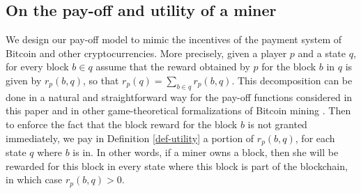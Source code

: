 
\subsection{On the pay-off and utility of a miner}
\label{sec-pay-uti}

We design our pay-off model to mimic the incentives of the payment system of Bitcoin and other cryptocurrencies. More precisely, given a player $p$ and a state $q$, for every block $b \in q$ assume that the reward obtained by $p$ for the block $b$ in $q$ is given by $r_p(b,q)$, so that $r_p(q) = \sum_{b \in q} r_p(b,q)$. This decomposition can be done in a natural and straightforward way for the pay-off functions considered in this paper and in other game-theoretical formalizations of Bitcoin mining \cite{mininggames:2016}. 
Then to enforce the fact that the block reward for the block $b$ is not granted immediately, we pay in Definition \ref{def-utility} a 
portion of $r_p(b,q)$, for each state $q$ where $b$ is in. In other words, if a miner owns a block, then she will be rewarded for this block in every state where this block is part of the blockchain, in which case $r_p(b,q) > 0$. %

